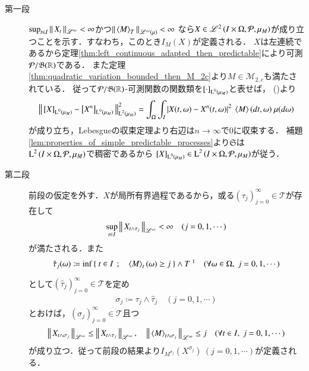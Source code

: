 	\begin{prf}\mbox{}
		\begin{description}
			\item[第一段] $\operatorname*{sup}_{t \in I} \left\|\, X_t\, \right\|_{\mathscr{L}^\infty} < \infty$かつ$\Norm{\inprod<M>_T}{\semiLp{\infty}{\mu}} < \infty$
				なら$X \in \mathscr{L}^{2} \left(I \times \Omega,\mathcal{P},\mu_M\right)$が成り立つことを示す．すなわち，このとき$I_M(X)$が定義される．
				$X$は左連続であるから定理\ref{thm:left_continuous_adapted_then_predictable}により可測$\mathcal{P}/\mathfrak{B}(\mathbb{R})$である．
				また定理\ref{thm:quadratic_variation_bounded_then_M_2c}より$M \in \mathcal{M}_{2,c}$も満たされている．
				従って$\mathcal{P}/\mathfrak{B}(\mathbb{R})$-可測関数の関数類を$\left[\cdot\right]_{\operatorname{L}^{0} \left(\mu_M\right)}$と表せば，
				()より
				\begin{align}
					\Norm{\equiv{X}{\Lp{0}{\mu_M}} - \equiv{X^n}{\Lp{0}{\mu_M}}}{\Lp{2}{\mu_M}}^2
					= \int_\Omega \int_I \left| X(t,\omega) - X^n(t,\omega) \right|^2\ \inprod<M>(dt,\omega)\ \mu(d\omega)
				\end{align}
				が成り立ち，Lebesgueの収束定理より右辺は$n \longrightarrow \infty$で0に収束する．
				補題\ref{lem:properties_of_simple_predictable_processes}より$\mathfrak{S}$は
				$\operatorname{L}^{2} \left(I \times \Omega,\mathcal{P},\mu_M\right)$で稠密であるから
				$\left[X\right]_{\operatorname{L}^{0} \left(\mu_M\right)} \in \operatorname{L}^{2} \left(I \times \Omega,\mathcal{P},\mu_M\right)$が従う．
				
			\item[第二段]
				前段の仮定を外す．$X$が局所有界過程であるから，或る$(\tau_j)_{j=0}^{\infty} \in \mathcal{T}$が存在して
				\begin{align}
					\operatorname*{sup}_{t \in I} \left\|\, X_{t \wedge \tau_j}\, \right\|_{\mathscr{L}^\infty} < \infty
					\quad (j=0,1,\cdots)
				\end{align}
				が満たされる．また
				\begin{align}
					\hat{\tau}_j(\omega) \coloneqq
					\inf{}{\Set{t \in I}{\inprod<M>_t(\omega) \geq j}} \wedge T\ \footnotemark
					\quad (\forall \omega \in \Omega,\ j=0,1,\cdots)
				\end{align}
				として$\left( \hat{\tau}_j \right)_{j=0}^{\infty} \in \mathcal{T}$を定め
				\begin{align}
					\sigma_j \coloneqq \tau_j \wedge \hat{\tau}_j
					\quad (j=0,1,\cdots)
				\end{align}
				とおけば，$(\sigma_j)_{j=0}^{\infty} \in \mathcal{T}$且つ
				\begin{align}
					\Norm{X_{t \wedge \sigma_j}}{\mathscr{L}^\infty} \leq \Norm{X_{t \wedge \tau_j}}{\mathscr{L}^\infty},
					\quad \Norm{\inprod<M>_{t \wedge \sigma_j}}{\mathscr{L}^\infty} \leq j
					\quad (\forall t \in I,\ j=0,1,\cdots)
				\end{align}
				が成り立つ．従って前段の結果より$I_{M^{\sigma_j}}(X^{\sigma_j})\ (j=0,1,\cdots)$が定義される．
				

\end{description}
\end{prf}
